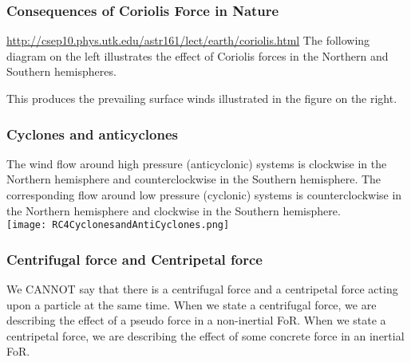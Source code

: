 \begin{frame}
\frametitle{Consequences of Coriolis Force in Nature}
\url{http://csep10.phys.utk.edu/astr161/lect/earth/coriolis.html}
The following diagram on the left illustrates the effect of Coriolis forces in the Northern and Southern hemispheres.
\begin{figure}
\centering
{}
\end{figure}
This produces the prevailing surface winds illustrated in the figure on the right. 
\end{frame}
\begin{frame}
\frametitle{Cyclones and anticyclones}
 The wind flow around high pressure (anticyclonic) systems is clockwise in the Northern hemisphere and counterclockwise in the Southern hemisphere. The corresponding flow around low pressure (cyclonic) systems is counterclockwise in the Northern hemisphere and clockwise in the Southern hemisphere.\\
\texttt{[image: RC4CyclonesandAntiCyclones.png]}
\end{frame}
\begin{frame}
\frametitle{Centrifugal force and Centripetal force}
We CANNOT say that there is a centrifugal force and a centripetal force acting upon a particle at the same time. When we state a centrifugal force, we are describing the \alert{effect} of a \alert{pseudo} force in a \alert{non-inertial} FoR. When we state a centripetal force, we are describing the \alert{effect} of some \alert{concrete} force in an \alert{inertial} FoR.
\end{frame}
